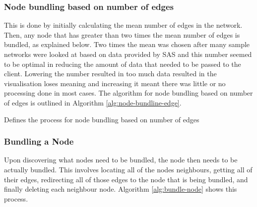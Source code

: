 \documentclass[../dissertation.tex]{subfiles}
\begin{document}
\subsubsection{Node bundling based on number of edges}

This is done by initially calculating the mean number of edges in the network. Then, any node that has greater than two times the mean number of edges is bundled, as explained below. Two times the mean was chosen after many sample networks were looked at based on data provided by SAS and this number seemed to be optimal in reducing the amount of data that needed to be passed to the client. Lowering the number resulted in too much data resulted in the visualisation loses meaning and increasing it meant there was little or no processing done in most cases. The algorithm for node bundling based on number of edges is outlined in Algorithm \ref{alg:node-bundline-edge}.

\begin{algorithm}[H]
\caption{Defines the process for node bundling based on number of edges}
\label{alg:node-bundline-edge}
\begin{algorithmic}
 
\ENDFOR
{}
    \ENDIF
\ENDFOR
{}
        \ENDIF
    \ENDFOR
      
\ENDWHILE
\end{algorithmic}
\end{algorithm}

\subsubsection{Bundling a Node}

Upon discovering what nodes need to be bundled, the node then needs to be actually bundled. This involves locating all of the nodes neighbours, getting all of their edges, redirecting all of those edges to the node that is being bundled, and finally deleting each neighbour node. Algorithm \ref{alg:bundle-node} shows this process.
\end{document}
